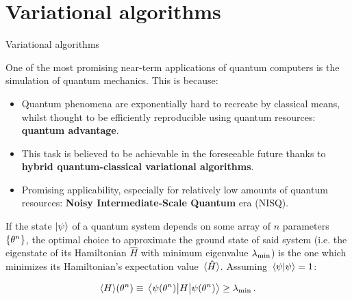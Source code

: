
\section{Variational algorithms}


\begin{frame}[allowframebreaks]{Variational algorithms}

  One of the most promising near-term applications of quantum computers is the simulation of quantum mechanics. This is because:

  \begin{itemize}
    \item<2-> Quantum phenomena are exponentially hard to recreate by classical means, whilst thought to be efficiently reproducible using quantum resources: \textbf{quantum advantage}.
    \item<3-> This task is believed to be achievable in the foreseeable future thanks to \textbf{hybrid quantum-classical variational algorithms}.
    \item<4-> Promising applicability, especially for relatively low amounts of quantum resources: \textbf{Noisy Intermediate-Scale Quantum} era (NISQ).
  \end{itemize}

\break

  \begin{theorem}
    If the state $\ket{\psi}$ of a quantum system depends on some array of $n$ parameters $\qty{\theta^{n}}$, the optimal choice to approximate the ground state of said system (i.e. the eigenstate of its Hamiltonian $\hat{H}$ with minimum eigenvalue $\lambda_{\textnormal{min}}$) is the one which minimizes its Hamiltonian's expectation value $\ev*{\hat{H}}$. Assuming $\braket*{\psi}=1$:

    \begin{gather*}
      \ev{H}\!\qty(\theta^{n}) \equiv
        \ev{H}{\psi\qty(\theta^{n})} \geq
        \lambda_{\textnormal{min}} \, .
    \end{gather*}
  \end{theorem}


\end{frame}
